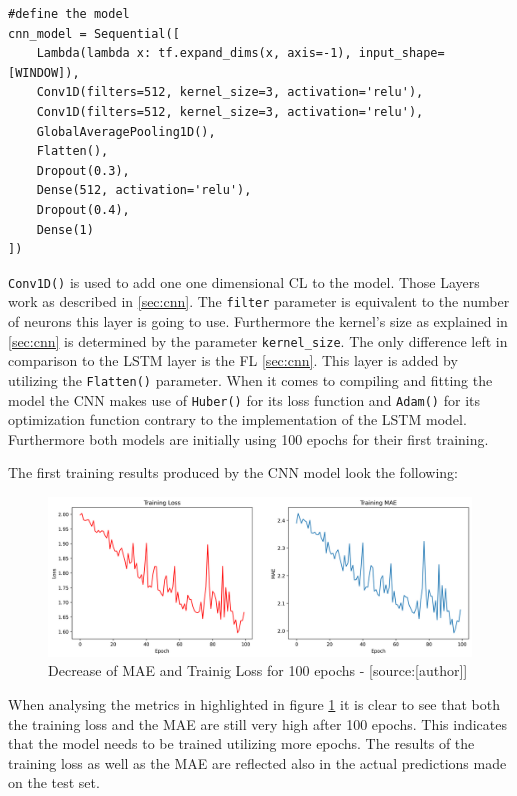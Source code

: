  \begin{lstlisting}
#define the model 
cnn_model = Sequential([
    Lambda(lambda x: tf.expand_dims(x, axis=-1), input_shape=[WINDOW]),
    Conv1D(filters=512, kernel_size=3, activation='relu'),
    Conv1D(filters=512, kernel_size=3, activation='relu'),
    GlobalAveragePooling1D(),
    Flatten(),
    Dropout(0.3),
    Dense(512, activation='relu'),
    Dropout(0.4),
    Dense(1)
])
\end{lstlisting}
\verb|Conv1D()| is used to add one one dimensional CL to the model. Those Layers work as described in \ref{sec:cnn}.  The \verb|filter| parameter is equivalent to the number of neurons this layer is going to use. Furthermore the kernel's size as explained in \ref{sec:cnn} is determined by the parameter \verb|kernel_size|.
The only difference left in comparison to the LSTM layer is the FL \ref{sec:cnn}. This layer is added by utilizing the \verb|Flatten()| parameter. When it comes to compiling and fitting the model the CNN makes use of  \verb|Huber()| for its loss function and \verb|Adam()| for its optimization function contrary to the implementation of the LSTM model. Furthermore both models are initially using 100 epochs for their first training. \newline

The first training results produced by the CNN model look the following: 

\begin{figure}[H]
	\centering
		\includegraphics[width=14cm]{images/cnn_1_mae}
	\caption{Decrease of MAE and Trainig Loss for 100 epochs - [source:[author]]}
	\label{fig:training_test_cnn}
\end{figure}
When analysing the metrics in highlighted in figure \ref{fig:training_test_cnn} it is clear to see that both the training loss and the MAE are still very high after 100 epochs. This indicates that the model needs to be trained utilizing more epochs. The results of the training loss as well as the MAE are reflected also in the actual predictions made on the test set.

